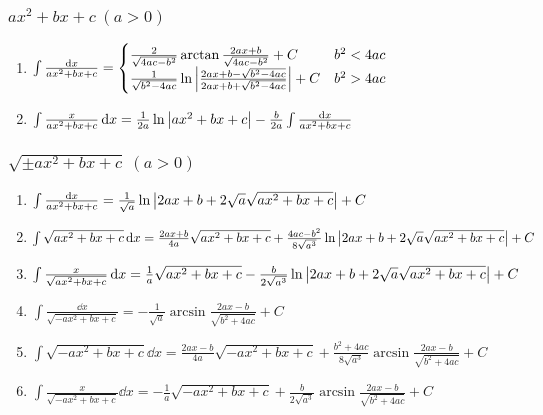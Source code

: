 \subsubsection{$ax^2+bx+c\ (a>0)$}
	\begin{enumerate}
		\item$\int\frac{\dd{x}}{ax^2+bx+c}=\begin{cases}
			\frac{2}{\sqrt{4ac-b^2}}\arctan\frac{2ax+b}{\sqrt{4ac-b^2}}+C							&b^2<4ac\\
			\frac{1}{\sqrt{b^2-4ac}}\ln\abs{\frac{2ax+b-\sqrt{b^2-4ac}}{2ax+b+\sqrt{b^2-4ac}}}+C	&b^2>4ac\\
		\end{cases}$
		\item$\int\frac{x}{ax^2+bx+c}\dd{x}=\frac{1}{2a}\ln\abs{ax^2+bx+c}-\frac{b}{2a}\int\frac{\dd{x}}{ax^2+bx+c}$
	\end{enumerate}
\subsubsection{$\sqrt{\pm ax^2+bx+c}\ (a>0)$}
	\begin{enumerate}
		\item$\int\frac{\dd{x}}{ax^2+bx+c}=\frac{1}{\sqrt{a}}\ln\abs{2ax+b+2\sqrt{a}\sqrt{ax^2+bx+c}}+C$
		\item$\int\sqrt{ax^2+bx+c}\dd{x}=\frac{2ax+b}{4a}\sqrt{ax^2+bx+c}+\frac{4ac-b^2}{8\sqrt{a^3}}\ln\abs{2ax+b+2\sqrt{a}\sqrt{ax^2+bx+c}}+C$
		\item$\int\frac{x}{\sqrt{ax^2+bx+c}}\dd{x}=\frac{1}{a}\sqrt{ax^2+bx+c}-\frac{b}{2\sqrt{a^3}}\ln\abs{2ax+b+2\sqrt{a}\sqrt{ax^2+bx+c}}+C$
		\item$\int\frac{\dd{x}}{\sqrt{-ax^2+bx+c}}=-\frac{1}{\sqrt{a}}\arcsin\frac{2ax-b}{\sqrt{b^2+4ac}}+C$
		\item$\int\sqrt{-ax^2+bx+c}\dd{x}=\frac{2ax-b}{4a}\sqrt{-ax^2+bx+c}+\frac{b^2+4ac}{8\sqrt{a^3}}\arcsin\frac{2ax-b}{\sqrt{b^2+4ac}}+C$
		\item$\int\frac{x}{\sqrt{-ax^2+bx+c}}\dd{x}=-\frac{1}{a}\sqrt{-ax^2+bx+c}+\frac{b}{2\sqrt{a^3}}\arcsin\frac{2ax-b}{\sqrt{b^2+4ac}}+C$
	\end{enumerate}
